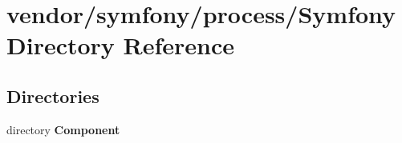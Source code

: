 \section{vendor/symfony/process/\+Symfony Directory Reference}
\label{dir_673e823a2bd57c573d0744260acce1c3}
\subsection*{Directories}
\begin{DoxyCompactItemize}
\item 
directory {\bf Component}
\end{DoxyCompactItemize}

